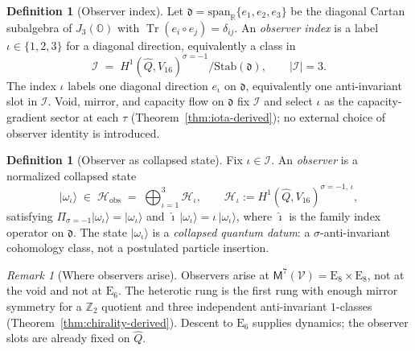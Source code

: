 \documentclass[aps,prd,onecolumn,amsmath,amssymb,nofootinbib,11pt]{revtex4-2}
\numberwithin{equation}{section}
\theoremstyle{plain}
\theoremstyle{definition}
\newtheorem{definition}[theorem]{Definition}
\theoremstyle{remark}
\newtheorem{remark}[theorem]{Remark}
\newcommand{\R}{\mathbb{R}}
\newcommand{\jalg}{J_3(\mathbb{O})}
\newcommand{\E}[1]{\mathrm{E}_{#1}}
\newcommand{\Tr}{\operatorname{Tr}}
\newcommand{\Void}{\mathcal{V}}
\newcommand{\Mirror}{\mathsf{M}}
\begin{document}
\begin{definition}[Observer index]\label{def:observer-index}
Let $\mathfrak{d}=\mathrm{span}_\R\{e_1,e_2,e_3\}$ be the diagonal Cartan
subalgebra of $\jalg$ with $\Tr(e_i\circ e_j)=\delta_{ij}$.
An \emph{observer index} is a label $\iota\in\{1,2,3\}$ for a diagonal direction,
equivalently a class in
\begin{equation}\label{eq:observer-index}
  \mathcal{I} \;=\; H^1(\hat Q,V_{16})^{\sigma=-1}/\mathrm{Stab}(\mathfrak{d}),
  \qquad |\mathcal{I}|=3.
\end{equation}
The index $\iota$ labels one diagonal direction $e_\iota$ on $\mathfrak{d}$,
equivalently one anti-invariant slot in $\mathcal{I}$. Void, mirror, and
capacity flow on $\mathfrak{d}$ fix $\mathcal{I}$ and select $\iota$ as the
capacity-gradient sector at each $\tau$ (Theorem~\ref{thm:iota-derived}); no
external choice of observer identity is introduced.
\end{definition}

\begin{definition}[Observer as collapsed state]\label{def:observer}
Fix $\iota\in\mathcal{I}$. An \emph{observer} is a normalized collapsed state
\begin{equation}\label{eq:observer-state}
  |\omega_\iota\rangle \;\in\; \mathcal{H}_{\mathrm{obs}}
  \;=\; \bigoplus_{\iota=1}^3 \mathcal{H}_\iota,
  \qquad
  \mathcal{H}_\iota := H^1(\hat Q,V_{16})^{\sigma=-1,\,\iota},
\end{equation}
satisfying $\Pi_{\sigma=-1}|\omega_\iota\rangle=|\omega_\iota\rangle$ and
$\hat{\imath}\,|\omega_\iota\rangle=\iota\,|\omega_\iota\rangle$, where
$\hat{\imath}$ is the family index operator on $\mathfrak{d}$.
The state $|\omega_\iota\rangle$ is a \emph{collapsed quantum datum}: a
$\sigma$-anti-invariant cohomology class, not a postulated particle insertion.
\end{definition}

\begin{remark}[Where observers arise]
Observers arise at $\Mirror^7(\Void)=\E{8}\times\E{8}$, not at the void and
not at $\E{6}$. The heterotic rung is the first rung with enough mirror
symmetry for a $\mathbb{Z}_2$ quotient and three independent anti-invariant
$1$-classes (Theorem~\ref{thm:chirality-derived}). Descent to $\E{6}$ supplies
dynamics; the observer slots are already fixed on $\hat Q$.
\end{remark}

\end{document}
